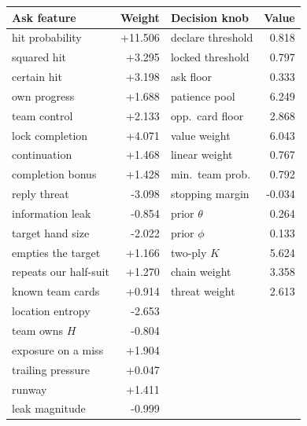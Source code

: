 \begin{tabular}{lrlr}
\toprule
Ask feature & Weight & Decision knob & Value \\
\midrule
hit probability & +11.506 & declare threshold & 0.818 \\
squared hit & +3.295 & locked threshold & 0.797 \\
certain hit & +3.198 & ask floor & 0.333 \\
own progress & +1.688 & patience pool & 6.249 \\
team control & +2.133 & opp.\ card floor & 2.868 \\
lock completion & +4.071 & value weight & 6.043 \\
continuation & +1.468 & linear weight & 0.767 \\
completion bonus & +1.428 & min.\ team prob. & 0.792 \\
reply threat & -3.098 & stopping margin & -0.034 \\
information leak & -0.854 & prior $\theta$ & 0.264 \\
target hand size & -2.022 & prior $\phi$ & 0.133 \\
empties the target & +1.166 & two-ply $K$ & 5.624 \\
repeats our half-suit & +1.270 & chain weight & 3.358 \\
known team cards & +0.914 & threat weight & 2.613 \\
location entropy & -2.653 &  &  \\
team owns $H$ & -0.804 &  &  \\
exposure on a miss & +1.904 &  &  \\
trailing pressure & +0.047 &  &  \\
runway & +1.411 &  &  \\
leak magnitude & -0.999 &  &  \\
\bottomrule
\end{tabular}
